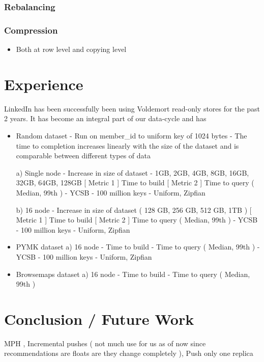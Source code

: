 \documentclass[10pt,twocolumn,preprint,natbib,authoryear]{sigplanconf}
\begin{document}
\subsubsection{Rebalancing}


\subsubsection{Compression}
\begin{itemize}
	\item Both at row level and copying level
\end{itemize}



\section{Experience}
LinkedIn has been successfully been using Voldemort read-only stores for the past 2 years. It has become an integral part of our data-cycle and has 

\begin{itemize}
	\item Random dataset
- Run on member\_id to uniform key of 1024 bytes
- The time to completion increases linearly with the size of the dataset and is comparable between different types of data

a) Single node - Increase in size of dataset - 1GB, 2GB, 4GB, 8GB, 16GB, 32GB, 64GB, 128GB 
       [ Metric 1 ] Time to build
       [ Metric 2 ] Time to query ( Median, 99th ) - YCSB - 100 million keys - Uniform, Zipfian 

b) 16 node - Increase in size of dataset ( 128 GB, 256 GB, 512 GB, 1TB )
      [ Metric 1 ] Time to build
      [ Metric 2 ] Time to query ( Median, 99th ) - YCSB - 100 million keys - Uniform, Zipfian 

	\item PYMK dataset
	a) 16 node 
       - Time to build
       - Time to query ( Median, 99th ) - YCSB - 100 million keys - Uniform, Zipfian 

	\item Browsemaps dataset
	a) 16 node
	   - Time to build
	   - Time to query ( Median, 99th )
\end{itemize}


\section{Conclusion / Future Work}

MPH \cite{External Perfect Hashing for Very Large Key Sets}, Incremental pushes ( not much use for us as of now since recommendations are floats are they change completely ), Push only one replica

\acks



    
\end{document}
